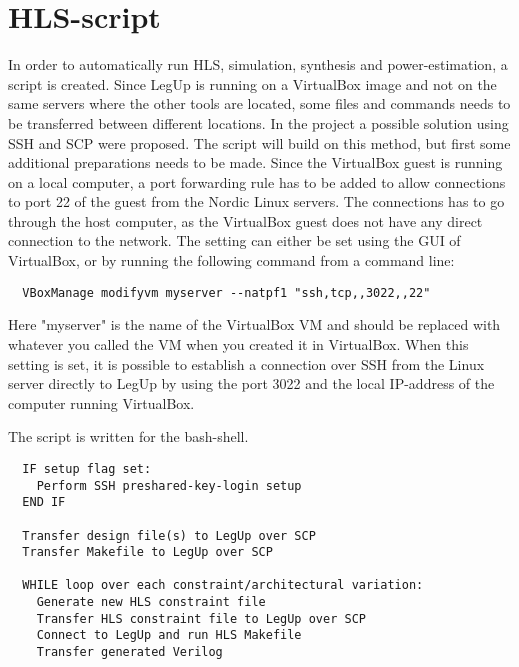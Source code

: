 \subsection{}
\section{HLS-script}
In order to automatically run HLS, simulation, synthesis and power-estimation, a script is created. Since LegUp is running on a VirtualBox image and not on the same servers where the other tools are located, some files and commands needs to be transferred between different locations. In the project \cite{holm2015pro} a possible solution using SSH and SCP were proposed. The script will build on this method, but first some additional preparations needs to be made. Since the VirtualBox guest is running on a local computer, a port forwarding rule has to be added to allow connections to port 22 of the guest from the Nordic Linux servers. The connections has to go through the host computer, as the VirtualBox guest does not have any direct connection to the network. The setting can either be set using the GUI of VirtualBox, or by running the following command from a command line:
\begin{verbatim}
  VBoxManage modifyvm myserver --natpf1 "ssh,tcp,,3022,,22"  
\end{verbatim}
Here "myserver" is the name of the VirtualBox VM and should be replaced with whatever you called the VM when you created it in VirtualBox. When this setting is set, it is possible to establish a connection over SSH from the Linux server directly to LegUp by using the port 3022 and the local IP-address of the computer running VirtualBox.
\lstset{language=[gnu] make, style=Cstyle}

The script is written for the bash-shell.

\begin{verbatim}
  IF setup flag set:
    Perform SSH preshared-key-login setup
  END IF
  
  Transfer design file(s) to LegUp over SCP
  Transfer Makefile to LegUp over SCP
  
  WHILE loop over each constraint/architectural variation:
    Generate new HLS constraint file
    Transfer HLS constraint file to LegUp over SCP
    Connect to LegUp and run HLS Makefile
    Transfer generated Verilog
\end{verbatim}

